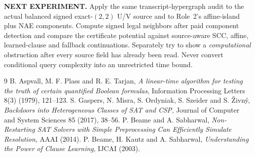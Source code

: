 \documentclass[11pt]{article}
\begin{document}
\par\noindent\textbf{NEXT EXPERIMENT.}
Apply the same transcript-hypergraph audit to the actual
balanced signed exact-$(2,2)$ U/V source and to Role~2's
affine-island plus NAE components. Compute signed legal
neighbors after paid component detection and compare
the certificate potential against source-aware SCC, affine,
learned-clause and fallback continuations. Separately try
to show a \emph{computational} obstruction after every
source field has already been read. Never convert
conditional query complexity into an unrestricted time bound.

\begin{thebibliography}{9}
 B. Aspvall, M. F. Plass and R. E. Tarjan,
\emph{A linear-time algorithm for testing the truth of certain
quantified Boolean formulas}, Information Processing Letters
8(3) (1979), 121--123.
 S. Gaspers, N. Misra, S. Ordyniak,
S. Szeider and S. \v Zivn\'y,
\emph{Backdoors into Heterogeneous Classes of SAT and CSP},
Journal of Computer and System Sciences 85 (2017), 38--56.
 P. Beame and A. Sabharwal,
\emph{Non-Restarting SAT Solvers with Simple Preprocessing
Can Efficiently Simulate Resolution},
AAAI (2014).
 P. Beame, H. Kautz and A. Sabharwal,
\emph{Understanding the Power of Clause Learning},
IJCAI (2003).
\end{thebibliography}
\end{document}
